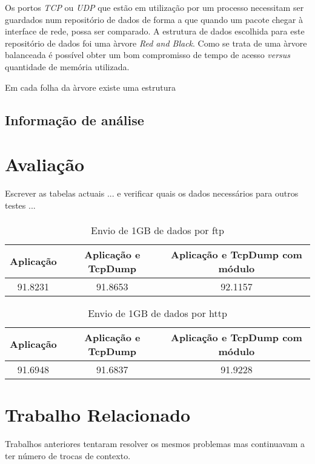 \documentclass[runningheads,a4paper]{llncs}
\begin{document}
Os portos \textit{TCP} ou \textit{UDP} que estão em utilização por um processo necessitam ser guardados num repositório de dados de forma a que quando um pacote chegar à interface de rede, possa ser comparado. 
A estrutura de dados escolhida para este repositório de dados foi uma àrvore \textit{Red and Black}. Como se trata de uma àrvore balanceada é possível obter um bom compromisso de tempo de acesso \textit{versus} quantidade de memória utilizada.

Em cada folha da àrvore existe uma estrutura 

\subsection*{Informação de análise}
\label{sub:data_information}

\section{Avaliação}
\label{sec:evaluation}

Escrever as tabelas actuais ... e verificar quais os dados necessários para outros testes ...
\paragraph*{}

\begin{table}
\caption{Envio de 1GB de dados por ftp}
\begin{tabular}{| c | c | c |}
\hline
\hspace {1cm} Aplicação \hspace {1cm} & Aplicação e TcpDump & Aplicação e TcpDump com módulo \\
\hline
91.8231 & 91.8653 & 92.1157 \\
\hline
\end{tabular}
\end{table}

\begin{center}
\begin{table}
\caption{Envio de 1GB de dados por http}
\begin{tabular}{ | c | c | c  | }
\hline
\hspace {1cm} Aplicação \hspace {1cm} & Aplicação e TcpDump & Aplicação e TcpDump com módulo \\
\hline
91.6948 & 91.6837 & 91.9228 \\
\hline
\end{tabular}
\end{table}
\end{center}

\section{Trabalho Relacionado}
\label{sec:related_work}
Trabalhos anteriores tentaram resolver os mesmos problemas mas continuavam a ter número de trocas de contexto.
\end{document}
